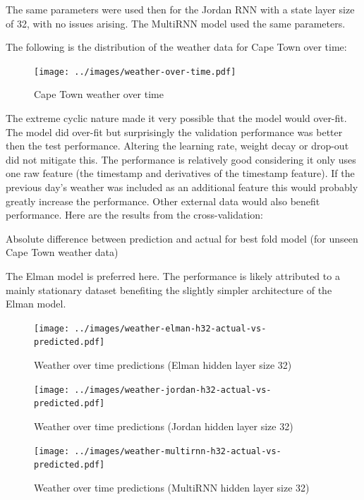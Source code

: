 \documentclass[conference]{IEEEtran}
\begin{document}
The same parameters were used then for the Jordan RNN with a state layer size of 32, with no issues arising. The MultiRNN model used the same parameters.

The following is the distribution of the weather data for Cape Town over time:

\begin{figure}[H] 
	\centering
	\texttt{[image: ../images/weather-over-time.pdf]}
	\caption{Cape Town weather over time}
	\label{fig:cape-town-weather-time}
\end{figure}

The extreme cyclic nature made it very possible that the model would over-fit. The model did over-fit but surprisingly the validation performance was better then the test performance. Altering the learning rate, weight decay or drop-out did not mitigate this. The performance is relatively good considering it only uses one raw feature (the timestamp and derivatives of the timestamp feature). If the previous day's weather was included as an additional feature this would probably greatly increase the performance. Other external data would also benefit performance. Here are the results from the cross-validation:

\begin{table}[H]
	\caption{Absolute difference between prediction and actual for best fold model (for unseen Cape Town weather data)}
	\label{tab:weather-ct-summary}
\end{table}

The Elman model is preferred here. The performance is likely attributed to a mainly stationary dataset benefiting the slightly simpler architecture of the Elman model.

\begin{figure}[H] 
	\centering
	\texttt{[image: ../images/weather-elman-h32-actual-vs-predicted.pdf]}
	\caption{Weather over time predictions (Elman hidden layer size 32)}
	\label{fig:weather-predictions-elman}
\end{figure}

\begin{figure}[H] 
	\centering
	\texttt{[image: ../images/weather-jordan-h32-actual-vs-predicted.pdf]}
	\caption{Weather over time predictions (Jordan hidden layer size 32)}
	\label{fig:weather-predictions-jordan}
\end{figure}

\begin{figure}[H] 
	\centering
	\texttt{[image: ../images/weather-multirnn-h32-actual-vs-predicted.pdf]}
	\caption{Weather over time predictions (MultiRNN hidden layer size 32)}
	\label{fig:weather-predictions-multi}
\end{figure}
\end{document}
